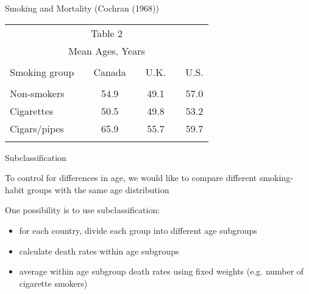 \documentclass{beamer}
\numberwithin{equation}{section}
\begin{document}
\begin{frame}{Smoking and Mortality (Cochran (1968))}

\begin{center}
 \begin{tabular}{lcccccc}
 \multicolumn{7}{c}{\small\sc Table 2}\\
 \multicolumn{7}{c}{\footnotesize\sc Mean Ages, Years}
 \vspace*{0.1cm}\\\hline\hline\\
 Smoking group&&Canada&&U.K.&&U.S.\\\hline\\
 Non-smokers&&54.9&&49.1&&57.0\\
 Cigarettes&&50.5&&49.8&&53.2\\
 Cigars/pipes&&65.9&&55.7&&59.7\\\hline\\
 \end{tabular}
\end{center}

\end{frame}

\begin{frame}{Subclassification}

To control for differences in age, we would like to compare different
smoking-habit groups with the same age distribution\bigskip

One possibility is to use subclassification:

\begin{itemize}
\itemsep1pt\parskip0pt
\item
  for each country, divide each group into different age subgroups
\item
  calculate death rates within age subgroups
\item
  average within age subgroup death rates using fixed weights (e.g.
  number of cigarette smokers)
\end{itemize}

\end{frame}
\end{document}
